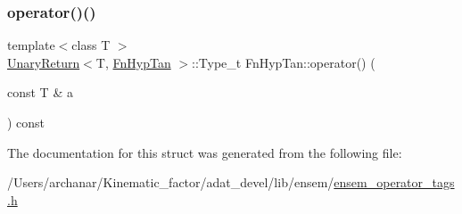 \mbox{\label{structFnHypTan_a549867ce795e58e29cc5c574347de91b}} 
\subsubsection{\texorpdfstring{operator()()}{operator()()}\hspace{0.1cm}{\footnotesize\ttfamily [2/2]}}
{\footnotesize\ttfamily template$<$class T $>$ \\
\mbox{\hyperlink{structUnaryReturn}{Unary\+Return}}$<$T, \mbox{\hyperlink{structFnHypTan}{Fn\+Hyp\+Tan}} $>$\+::Type\+\_\+t Fn\+Hyp\+Tan\+::operator() (\begin{DoxyParamCaption}\item[{const T \&}]{a }\end{DoxyParamCaption}) const\hspace{0.3cm}{\ttfamily [inline]}}



The documentation for this struct was generated from the following file\+:\begin{DoxyCompactItemize}
\item 
/\+Users/archanar/\+Kinematic\+\_\+factor/adat\+\_\+devel/lib/ensem/\mbox{\hyperlink{lib_2ensem_2ensem__operator__tags_8h}{ensem\+\_\+operator\+\_\+tags.\+h}}\end{DoxyCompactItemize}
